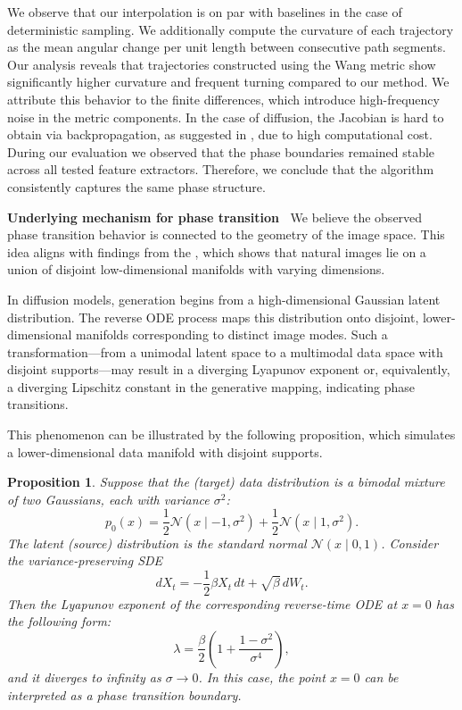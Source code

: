 \documentclass{article}
\theoremstyle{plain}
\newtheorem{proposition}[theorem]{Proposition}
\theoremstyle{definition}
\theoremstyle{remark}
\begin{document}
We observe that our interpolation is on par with baselines in the case of deterministic sampling. We additionally compute the curvature of each trajectory as the mean angular change per unit length between consecutive path segments. Our analysis reveals that trajectories constructed using the Wang metric show significantly higher curvature and frequent turning compared to our method. We attribute this behavior to the finite differences, which introduce high-frequency noise in the metric components. In the case of diffusion, the Jacobian is hard to obtain via backpropagation, as suggested in \citet{shao2018riemannian}, due to high computational cost. During our evaluation we observed that the phase boundaries remained stable across all tested feature extractors. Therefore, we conclude that the algorithm consistently captures the same phase structure.

\textbf{Underlying mechanism for phase transition~} We believe the observed phase transition behavior is connected to the geometry of the image space. This idea aligns with findings from the \citet{brown2022verifying}, which shows that natural images lie on a union of disjoint low-dimensional manifolds with varying dimensions.

In diffusion models, generation begins from a high-dimensional Gaussian latent distribution. The reverse ODE process maps this distribution onto disjoint, lower-dimensional manifolds corresponding to distinct image modes. Such a transformation—from a unimodal latent space to a multimodal data space with disjoint supports—may result in a diverging Lyapunov exponent or, equivalently, a diverging Lipschitz constant in the generative mapping, indicating phase transitions.

This phenomenon can be illustrated by the following proposition, which simulates a lower-dimensional data manifold with disjoint supports.

\begin{proposition} Suppose that the (target) data distribution is a bimodal mixture of two Gaussians, each with variance $\sigma^2$:
\begin{equation}
p_0(x) = \frac{1}{2}\mathcal{N}(x\mid -1,\sigma^2) + \frac{1}{2}\mathcal{N}(x\mid 1,\sigma^2).
\end{equation}
The latent (source) distribution is the standard normal $\mathcal{N}(x\mid 0,1)$. Consider the variance-preserving SDE
\begin{equation}
dX_t = -\frac{1}{2}\beta X_t\, dt + \sqrt{\beta}\, dW_t.
\end{equation}
Then the Lyapunov exponent of the corresponding reverse-time ODE at $x=0$ has the following form:
\begin{equation}
\lambda = \frac{\beta}{2} \left(1 + \frac{1 - \sigma^2}{\sigma^4} \right),
\end{equation}
and it diverges to infinity as $\sigma \to 0$. In this case, the point $x=0$ can be interpreted as a phase transition boundary.
\end{proposition}
\end{document}
